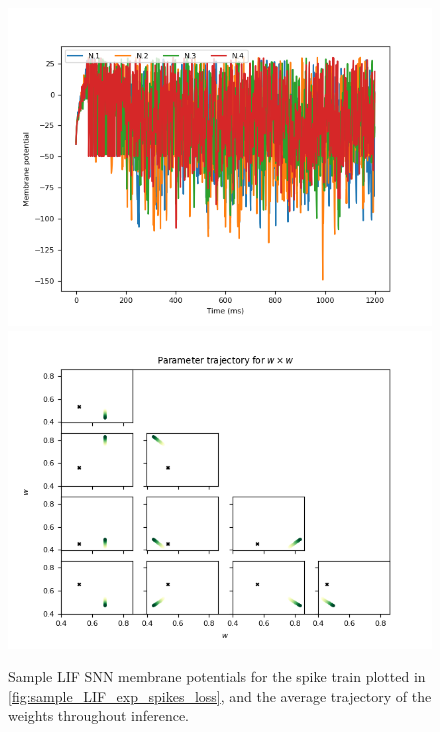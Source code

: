 \documentclass[mphil,deptreport,ianc]{infthesis} %
\begin{document}
\begin{figure}
    \centering
    \vspace{-0.1in}
    \includegraphics[width=0.9\columnwidth]{figures/samples/LIF/12-10_09-55-57-223/membrane_pots_train_i_100.png}
    \vspace{-0.1in}
    \includegraphics[width=0.9\columnwidth]{figures/samples/LIF/12-10_09-55-57-223/test_weights_inference_trajectories_param_w.png}
    \vspace{-0.1in}
    \caption{Sample LIF SNN membrane potentials for the spike train plotted in \ref{fig:sample_LIF_exp_spikes_loss}, and the average trajectory of the weights throughout inference.}
    \label{fig:sample_LIF_exp_vs_traject}
\end{figure}

\end{document}
